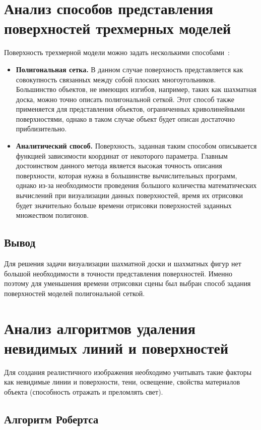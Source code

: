 \section{Анализ способов представления поверхностей трехмерных моделей}
Поверхность трехмерной модели можно задать несколькими способами~\cite{deymin}:
\begin{itemize}
	\item \textbf{Полигональная сетка.} В данном случае поверхность представляется как совокупность связанных между собой плоских многоугольников. Большинство объектов, не имеющих изгибов, например, таких как шахматная доска, можно точно описать полигональной сеткой. Этот способ также применяется для представления объектов, ограниченных криволинейными
	поверхностями, однако в таком случае объект будет описан достаточно приблизительно.
	
	\item \textbf{Аналитический способ.} Поверхность, заданная таким способом описывается функцией зависимости координат от некоторого параметра. Главным достоинством данного метода является высокая точность описания поверхности, которая нужна в большинстве вычислительных программ, однако из-за необходимости проведения большого количества математических вычислений при визуализации данных поверхностей, время их отрисовки будет значительно больше времени отрисовки поверхностей заданных множеством полигонов.
\end{itemize}

\subsection*{Вывод}
Для решения задачи визуализации шахматной доски и шахматных фигур нет большой необходимости в точности представления поверхностей. Именно поэтому для уменьшения времени отрисовки сцены был выбран способ задания поверхностей моделей полигональной сеткой.

\clearpage
\section{Анализ алгоритмов удаления невидимых линий и поверхностей}
Для создания реалистичного изображения необходимо учитывать такие факторы как невидимые линии и поверхности, тени, освещение, свойства материалов объекта (способность отражать и преломлять свет).

\subsection{Алгоритм Робертса}

